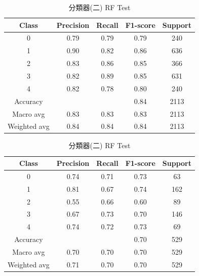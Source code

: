 \begin{enumerate}
\begin{enumerate}
                \begin{table}[H]
                \centering
                \scriptsize
                \begin{minipage}{0.48\textwidth}
                \centering
                \begin{tabular}{c|cccc}
                \hline
                Class & Precision & Recall & F1-score & Support \\
                \hline
                0 & 0.79 & 0.79 & 0.79 & 240 \\
                1 & 0.90 & 0.82 & 0.86 & 636 \\
                2 & 0.83 & 0.86 & 0.85 & 366 \\
                3 & 0.82 & 0.89 & 0.85 & 631 \\
                4 & 0.82 & 0.78 & 0.80 & 240 \\
                \hline
                Accuracy &       &       & 0.84 & 2113 \\
                Macro avg & 0.83 & 0.83 & 0.83 & 2113 \\
                Weighted avg & 0.84 & 0.84 & 0.84 & 2113 \\
                \hline
                \end{tabular}
                \caption{分類器(二) RF Train}
                \label{tab:classifier_2_report_train_rf_rf_filtered}
                \end{minipage}%
                \hfill
                \begin{minipage}{0.48\textwidth}
                \centering
                \begin{tabular}{c|cccc}
                \hline
                Class & Precision & Recall & F1-score & Support \\
                \hline
                0 & 0.74 & 0.71 & 0.73 & 63 \\
                1 & 0.81 & 0.67 & 0.74 & 162 \\
                2 & 0.55 & 0.66 & 0.60 & 89 \\
                3 & 0.67 & 0.73 & 0.70 & 146 \\
                4 & 0.74 & 0.72 & 0.73 & 69 \\
                \hline
                Accuracy &       &       & 0.70 & 529 \\
                Macro avg & 0.70 & 0.70 & 0.70 & 529 \\
                Weighted avg & 0.71 & 0.70 & 0.70 & 529 \\
                \hline
                \end{tabular}
                \caption{分類器(二) RF Test}
                \label{tab:classifier_2_report_test_rf_rf_filtered}
                \end{minipage}
                \end{table}



\end{enumerate}
\end{enumerate}
